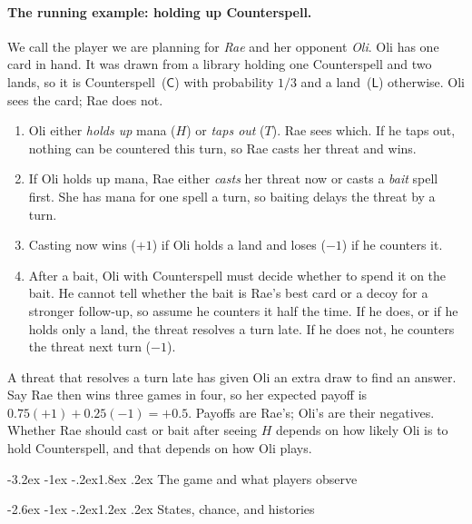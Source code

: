 \documentclass[11pt,a4paper]{article}
\makeatletter
\renewcommand\section{\@startsection{section}{1}{\z@}
  {-3.2ex \@plus -1ex \@minus -.2ex}{1.8ex \@plus .2ex}
  {\normalfont\Large\sffamily\bfseries\color{ink}}}
\renewcommand\subsection{\@startsection{subsection}{2}{\z@}
  {-2.6ex \@plus -1ex \@minus -.2ex}{1.2ex \@plus .2ex}
  {\normalfont\large\sffamily\bfseries\color{ink}}}
\theoremstyle{plain}
\theoremstyle{definition}
\newcommand{\Cs}{\mathsf C}
\newcommand{\Ld}{\mathsf L}
\makeatother
\begin{document}
\paragraph{The running example: holding up Counterspell.}
We call the player we are planning for \emph{Rae} and her opponent \emph{Oli}.
Oli has one card in hand. It was drawn from a library holding one Counterspell
and two lands, so it is Counterspell~($\Cs$) with probability $1/3$ and a
land~($\Ld$) otherwise. Oli sees the card; Rae does not.
\begin{enumerate}
\item Oli either \emph{holds up} mana ($H$) or \emph{taps out} ($T$). Rae sees
  which. If he taps out, nothing can be countered this turn, so Rae casts her
  threat and wins.
\item If Oli holds up mana, Rae either \emph{casts} her threat now or casts a
  \emph{bait} spell first. She has mana for one spell a turn, so baiting
  delays the threat by a turn.
\item Casting now wins ($+1$) if Oli holds a land and loses ($-1$) if he
  counters it.
\item After a bait, Oli with Counterspell must decide whether to spend it on
  the bait. He cannot tell whether the bait is Rae's best card or a decoy for a
  stronger follow-up, so assume he counters it half the time. If he does, or
  if he holds only a land, the threat resolves a turn late. If he does not, he
  counters the threat next turn ($-1$).
\end{enumerate}
A threat that resolves a turn late has given Oli an extra draw to find an
answer. Say Rae then wins three games in four, so her expected payoff is
$0.75(+1)+0.25(-1)=+0.5$. Payoffs are Rae's; Oli's are their negatives. Whether Rae should cast or bait
after seeing $H$ depends on how likely Oli is to hold Counterspell, and
that depends on how Oli plays.

\section{The game and what players observe}
\label{sec:game}

\subsection{States, chance, and histories}
\end{document}
